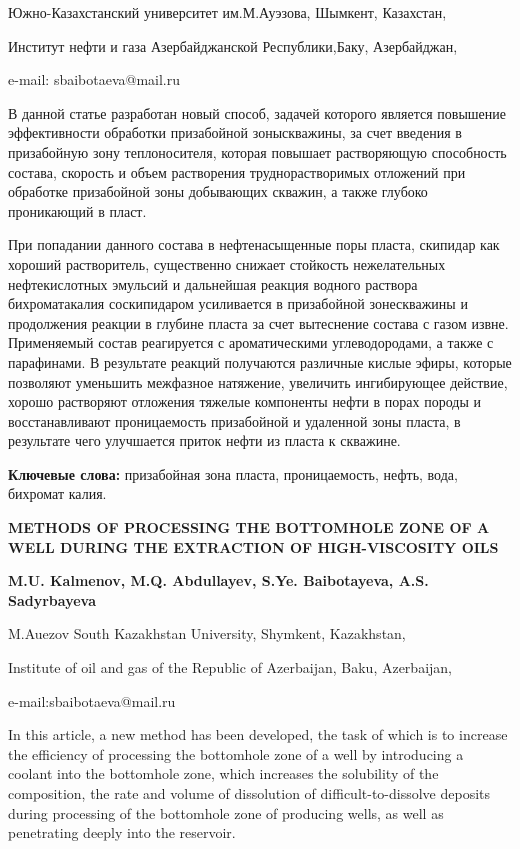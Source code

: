 \begin{affil}
Южно-Казахстанский университет им.М.Ауэзова, Шымкент, Казахстан,

Институт нефти и газа Азербайджанской Республики,Баку, Азербайджан,

e-mail: sbaibotaeva@mail.ru
\end{affil}

В данной статье разработан новый способ, задачей которого является
повышение эффективности обработки призабойной зоныскважины, за счет
введения в призабойную зону теплоносителя, которая повышает растворяющую
способность состава, скорость и объем растворения труднорастворимых
отложений при обработке призабойной зоны добывающих скважин, а также
глубоко проникающий в пласт.

При попадании данного состава в нефтенасыщенные поры пласта, скипидар
как хороший растворитель, существенно снижает стойкость нежелательных
нефтекислотных эмульсий и дальнейшая реакция водного раствора
бихроматакалия соскипидаром усиливается в призабойной зонескважины и
продолжения реакции в глубине пласта за счет вытеснение состава с газом
извне. Применяемый состав реагируется с ароматическими углеводородами, а
также с парафинами. В результате реакций получаются различные кислые
эфиры, которые позволяют уменьшить межфазное натяжение, увеличить
ингибирующее действие, хорошо растворяют отложения тяжелые компоненты
нефти в порах породы и восстанавливают проницаемость призабойной и
удаленной зоны пласта, в результате чего улучшается приток нефти из
пласта к скважине.

{\bfseries Ключевые слова:} призабойная зона пласта, проницаемость, нефть,
вода, бихромат калия.

\begin{header}
{\bfseries METHODS OF PROCESSING THE BOTTOMHOLE ZONE OF A WELL DURING THE EXTRACTION OF HIGH-VISCOSITY OILS}

{\bfseries
{}M.U. Kalmenov,
M.Q. Abdullayev,
S.Ye. Baibotayeva\envelope,
A.S. Sadyrbayeva
}
\end{header}

\begin{affil}
M.Auezov South Kazakhstan University, Shymkent, Kazakhstan,

Institute of oil and gas of the Republic of Azerbaijan, Baku, Azerbaijan,

e-mail:sbaibotaeva@mail.ru
\end{affil}

In this article, a new method has been developed, the task of which is
to increase the efficiency of processing the bottomhole zone of a well
by introducing a coolant into the bottomhole zone, which increases the
solubility of the composition, the rate and volume of dissolution of
difficult-to-dissolve deposits during processing of the bottomhole zone
of producing wells, as well as penetrating deeply into the reservoir.

